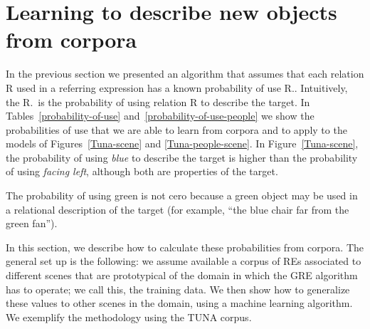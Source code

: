 \section{Learning to describe new objects from corpora}
\label{sec:learning}

In the previous section we presented an algorithm that assumes that each relation R 
used in a referring expression has a known probability of use R.\puse. 
Intuitively, the R.\puse~is the probability of using relation R to describe the target. In Tables~\ref{probability-of-use} and~\ref{probability-of-use-people} we show the probabilities of use that we are able to learn from corpora and to apply to the models of Figures~\ref{Tuna-scene} and \ref{Tuna-people-scene}.  In Figure~\ref{Tuna-scene}, the probability of using \emph{blue} to describe the target is higher than the probability of using \emph{facing left}, although both are properties of the target.

The probability of using green is not cero because a green object may be used in a relational description of the target (for example, ``the blue chair far from the green fan''). 

In this section, we describe how to calculate these probabilities from corpora.  
The general set up is the following: we assume available a corpus of REs associated 
to different scenes that are prototypical of the domain in which the GRE algorithm has to operate; we call this, the training data.   
We then show how to generalize these values to other scenes in the domain, using a machine learning algorithm. We exemplify the methodology using the TUNA corpus. 

